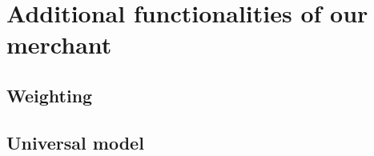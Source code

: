 \section{Additional functionalities of our merchant}
\subsection{Weighting}
\subsection{Universal model}
